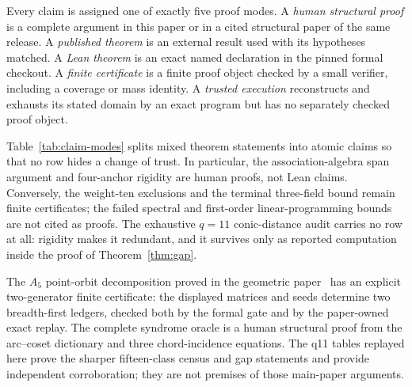 \documentclass[11pt]{article}
\theoremstyle{remark}
\begin{document}
Every claim is assigned one of exactly five proof modes.  A \emph{human
structural proof} is a complete argument in this paper or in a cited
structural paper of the same release.  A \emph{published theorem} is an
external result used with its hypotheses matched.  A \emph{Lean theorem} is an exact named declaration in
the pinned formal checkout.  A \emph{finite certificate} is a finite proof
object checked by a small verifier, including a coverage or mass identity.
A \emph{trusted execution} reconstructs and exhausts its stated domain by an
exact program but has no separately checked proof object.

Table~\ref{tab:claim-modes} splits mixed theorem statements into atomic
claims so that no row hides a change of trust.  In particular, the
association-algebra span argument and four-anchor rigidity are human proofs,
not Lean claims.  Conversely, the weight-ten exclusions and the terminal
three-field bound remain finite certificates; the failed spectral and
first-order linear-programming bounds are not cited as proofs.  The
exhaustive $q=11$ conic-distance audit carries no row at all: rigidity
makes it redundant, and it survives only as reported computation inside the
proof of Theorem~\ref{thm:gap}.

The $A_5$ point-orbit decomposition proved in the geometric
paper~\cite{RuddRigidity2026} has an explicit two-generator finite
certificate: the displayed matrices and seeds determine
two breadth-first ledgers, checked both by the formal gate and by the
paper-owned exact replay. The complete syndrome oracle is a human structural
proof from the arc--coset dictionary and three chord-incidence equations. The
q11 tables replayed here prove the sharper fifteen-class census and gap
statements and provide independent corroboration; they are not premises of
those main-paper arguments.
\end{document}
